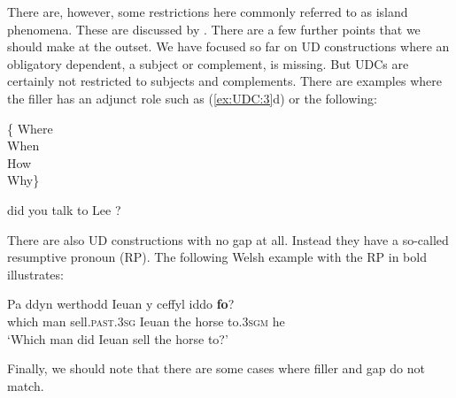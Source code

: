 \documentclass[output=paper
                ,modfonts
                ,nonflat
	        ,collection
	        ,collectionchapter
	        ,collectiontoclongg
 	        ,biblatex
                ,babelshorthands
                ,newtxmath
                ,draftmode
                ,colorlinks, citecolor=brown
]{./langsci/langscibook}
\begin{document}
{  \noindent There are, however, some
  restrictions here commonly referred to as island phenomena. These
  are discussed by .  There are a few
  further points that we should make at the outset. We have focused so
  far on UD constructions where an obligatory dependent, a subject or
  complement, is missing. But UDCs are certainly not restricted to
  subjects and complements.  There are examples where the filler has
  an adjunct role such as (\ref{ex:UDC:3}d) or the following:

  \begin{exe} \ex \label{ex:UDC:6} \begin{avm}
      \{ \normalfont Where\\ \normalfont When\\ \normalfont How\\
      \normalfont Why\} \end{avm} did you talk to Lee
    \trace{}?  \end{exe}

  \noindent 
  There are also UD constructions with no gap at all. Instead they
  have a so-called resumptive pronoun (RP). The following Welsh
  example with the RP in bold illustrates:

  \begin{exe} \ex \label{ex:UDC:7}
  \gll Pa ddyn werthodd Ieuan y ceffyl iddo \textbf{fo}?\\
  which man sell.\textsc{past.3sg} Ieuan the horse to\textsc{.3sgm} he\\
  \glt `Which man did Ieuan sell the horse to?'  \end{exe}

\noindent
Finally, we should note that there are some cases where filler and gap
do not match.

\begin{exe} \ex \begin{xlist} \label{ex:UDC:8}     \end{xlist} \end{exe}

}
\end{document}
